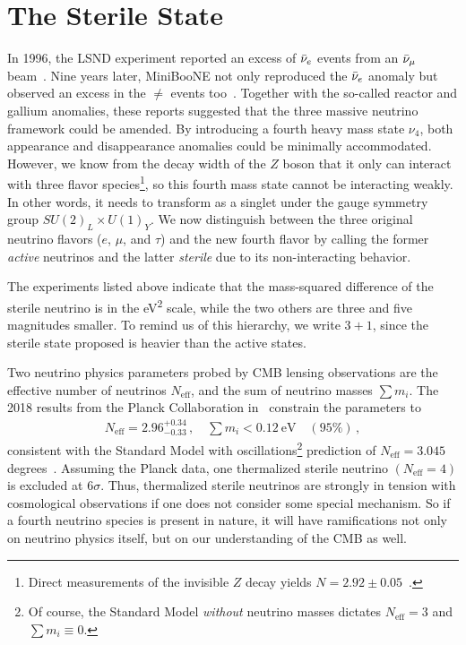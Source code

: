 \section{The Sterile State}\label{sec:anomalies}
In 1996, the LSND experiment reported an excess of $\bar{\nu}_e$ events from an $\bar{\nu}_\mu$ beam~\cite{lsnd}.  
Nine years later, MiniBooNE not only reproduced the $\bar{\nu}_e$ anomaly but observed an excess in the
$\ne$ events too~\cite{miniboone}. Together with the so-called reactor and gallium anomalies, these reports suggested 
that the three massive neutrino framework could be amended.
By introducing a fourth heavy mass state $\nu_4$, both appearance and disappearance anomalies could be minimally accommodated.
However, we know from the decay width of the $Z$ boson that it only can interact with three flavor species\footnote{
    Direct measurements of the invisible $Z$ decay yields $N=2.92 \pm 0.05$~\cite{pdg}.
}, 
so this fourth mass state cannot be interacting weakly. In other words, it needs to transform as a
singlet under the gauge symmetry group $SU(2)_L \times U(1)_{Y}$.
We now distinguish between the three original neutrino flavors ($e$, $\mu$, and $\tau$) and the new fourth 
flavor by calling the former \emph{active} neutrinos
and the latter \emph{sterile} due to its non-interacting behavior.

The experiments listed above indicate that the mass-squared difference of the 
sterile neutrino is in the \si{\eV\squared} scale, while the two others
are three and five magnitudes smaller. To remind us of this hierarchy, we write $3+1$, since the sterile state 
proposed is heavier than the active states.


Two neutrino physics parameters probed by CMB lensing observations are the effective number of neutrinos
$N_\text{eff}$, and the sum of neutrino masses $\sum m_i$. 
The 2018 results from the Planck Collaboration in~\cite{planck2018} constrain the parameters to 
\begin{align}
    N_\text{eff} = 2.96^{+0.34}_{-0.33}\,, \quad \sum m_i < \SI{0.12}{\eV} \quad (95\%)\,,
\end{align}
consistent with the Standard Model with oscillations\footnote{Of course, the 
Standard Model \emph{without} neutrino masses dictates $N_\text{eff} = 3$ and $\sum m_i \equiv 0$.} prediction of $N_\text{eff} = 3.045$ degrees~\cite{desalas2016}.
Assuming the Planck data, one thermalized sterile neutrino $(N_\text{eff} = 4)$ is excluded at $6\sigma$. 
Thus, thermalized sterile 
neutrinos are strongly in tension with cosmological observations if one does not consider some special mechanism.
So if a fourth neutrino species is present in nature, it will have ramifications not only on neutrino physics itself, but on
our understanding of the CMB as well.


